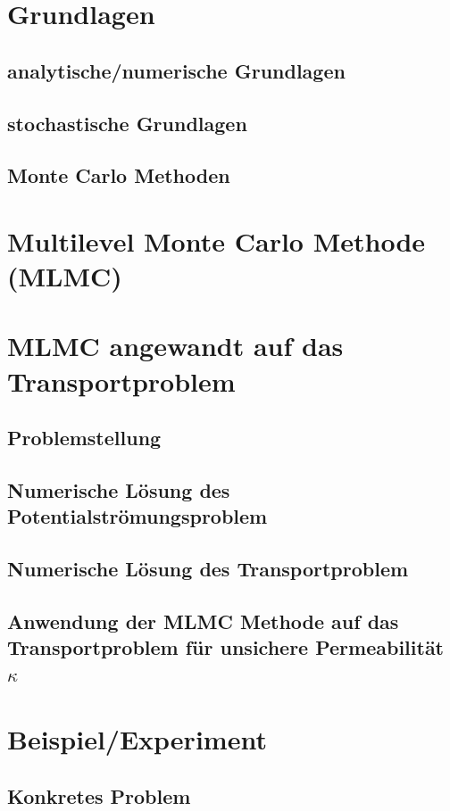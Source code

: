 \documentclass[12pt,a4paper]{scrartcl}
\numberwithin{equation}{section}
\begin{document}
 \newpage  %
 
\section{Grundlagen}
\subsection{analytische/numerische Grundlagen}
\subsection{stochastische Grundlagen}
\subsection{Monte Carlo Methoden}
\section{Multilevel Monte Carlo Methode (MLMC)}
\section{MLMC angewandt auf das Transportproblem}
\subsection{Problemstellung}
\subsection{Numerische Lösung des Potentialströmungsproblem}
\subsection{Numerische Lösung des Transportproblem}
\subsection{Anwendung der MLMC Methode auf das Transportproblem für unsichere Permeabilität $\kappa$ }
\section{Beispiel/Experiment}
\subsection{Konkretes Problem}
\end{document}
